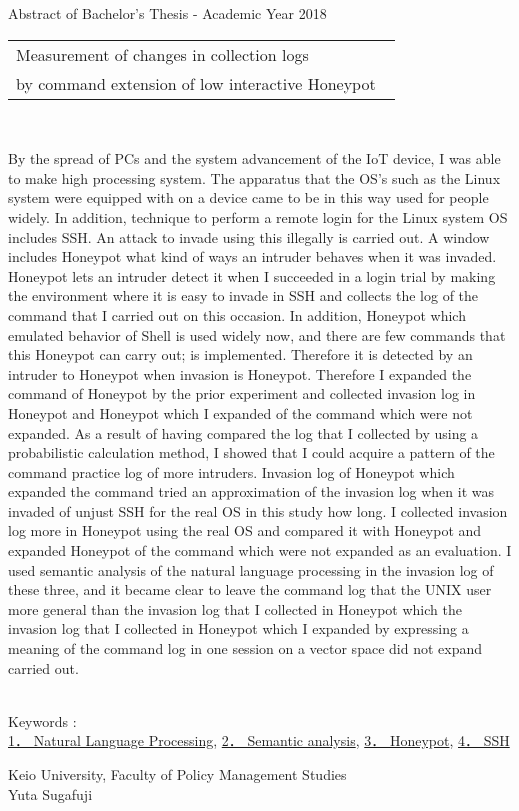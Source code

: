 Abstract of Bachelor's Thesis - Academic Year 2018
\begin{center}
\begin{large}
\begin{tabular}{|M{0.97\linewidth}|}
    \hline
        Measurement of changes in collection logs\\
        by command extension of low interactive Honeypot\\
    \hline
\end{tabular}
\end{large}
\end{center}

~ \\
\renewcommand{\baselinestretch}{0.9}

By the spread of PCs and the system advancement of the IoT device, I was able to make high processing system. The apparatus that the OS's such as the Linux system were equipped with on a device came to be in this way used for people widely. In addition, technique to perform a remote login for the Linux system OS includes SSH. An attack to invade using this illegally is carried out.
A window includes Honeypot what kind of ways an intruder behaves when it was invaded. Honeypot lets an intruder detect it when I succeeded in a login trial by making the environment where it is easy to invade in SSH and collects the log of the command that I carried out on this occasion. In addition, Honeypot which emulated behavior of Shell is used widely now, and there are few commands that this Honeypot can carry out; is implemented. Therefore it is detected by an intruder to Honeypot when invasion is Honeypot. Therefore I expanded the command of Honeypot by the prior experiment and collected invasion log in Honeypot and Honeypot which I expanded of the command which were not expanded. As a result of having compared the log that I collected by using a probabilistic calculation method, I showed that I could acquire a pattern of the command practice log of more intruders. Invasion log of Honeypot which expanded the command tried an approximation of the invasion log when it was invaded of unjust SSH for the real OS in this study how long. I collected invasion log more in Honeypot using the real OS and compared it with Honeypot and expanded Honeypot of the command which were not expanded as an evaluation. I used semantic analysis of the natural language processing in the invasion log of these three, and it became clear to leave the command log that the UNIX user more general than the invasion log that I collected in Honeypot which the invasion log that I collected in Honeypot which I expanded by expressing a meaning of the command log in one session on a vector space did not expand carried out.

\renewcommand{\baselinestretch}{1.0}

~ \\
Keywords : \\
\underline{1． Natural Language Processing},
\underline{2． Semantic analysis},
\underline{3． Honeypot},
\underline{4． SSH}
\begin{flushright}
Keio University, Faculty of Policy Management Studies\\
Yuta Sugafuji
\end{flushright}
